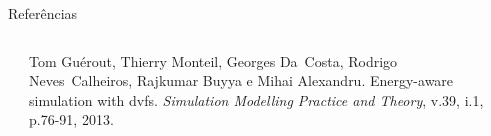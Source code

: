 \documentclass[final]{beamer}
\begin{document}
\begin{frame}[t]
\begin{block}{Referências}
\begin{columns}[t]
\begin{column}{0.35\columnwidth}
	\end{column}

	\begin{column}{0.30\columnwidth}

			\footnotesize{\begin{thebibliography}{99}


			Tom Gu{\'e}rout, Thierry Monteil, Georges Da~Costa, Rodrigo Neves~Calheiros,
			  Rajkumar Buyya e Mihai Alexandru.
			Energy-aware simulation with dvfs.
			{\em Simulation Modelling Practice and Theory}, v.39, i.1, p.76-91, 2013.



			\end{thebibliography}}

	\end{column}

	\begin{column}{0.30\columnwidth}

			\footnotesize{\begin{thebibliography}{99}




\end{thebibliography}}
\end{column}
\end{columns}
\end{block}
\end{frame}
\end{document}
